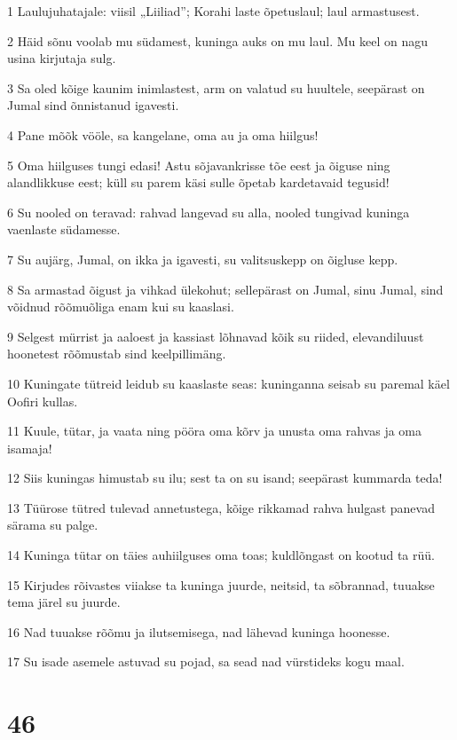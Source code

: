 \par 1 Laulujuhatajale: viisil „Liiliad”; Korahi laste õpetuslaul; laul armastusest.
\par 2 Häid sõnu voolab mu südamest, kuninga auks on mu laul. Mu keel on nagu usina kirjutaja sulg.
\par 3 Sa oled kõige kaunim inimlastest, arm on valatud su huultele, seepärast on Jumal sind õnnistanud igavesti.
\par 4 Pane mõõk vööle, sa kangelane, oma au ja oma hiilgus!
\par 5 Oma hiilguses tungi edasi! Astu sõjavankrisse tõe eest ja õiguse ning alandlikkuse eest; küll su parem käsi sulle õpetab kardetavaid tegusid!
\par 6 Su nooled on teravad: rahvad langevad su alla, nooled tungivad kuninga vaenlaste südamesse.
\par 7 Su aujärg, Jumal, on ikka ja igavesti, su valitsuskepp on õigluse kepp.
\par 8 Sa armastad õigust ja vihkad ülekohut; sellepärast on Jumal, sinu Jumal, sind võidnud rõõmuõliga enam kui su kaaslasi.
\par 9 Selgest mürrist ja aaloest ja kassiast lõhnavad kõik su riided, elevandiluust hoonetest rõõmustab sind keelpillimäng.
\par 10 Kuningate tütreid leidub su kaaslaste seas: kuninganna seisab su paremal käel Oofiri kullas.
\par 11 Kuule, tütar, ja vaata ning pööra oma kõrv ja unusta oma rahvas ja oma isamaja!
\par 12 Siis kuningas himustab su ilu; sest ta on su isand; seepärast kummarda teda!
\par 13 Tüürose tütred tulevad annetustega, kõige rikkamad rahva hulgast panevad särama su palge.
\par 14 Kuninga tütar on täies auhiilguses oma toas; kuldlõngast on kootud ta rüü.
\par 15 Kirjudes rõivastes viiakse ta kuninga juurde, neitsid, ta sõbrannad, tuuakse tema järel su juurde.
\par 16 Nad tuuakse rõõmu ja ilutsemisega, nad lähevad kuninga hoonesse.
\par 17 Su isade asemele astuvad su pojad, sa sead nad vürstideks kogu maal.

\chapter{46}


